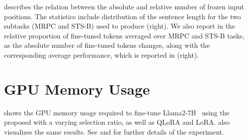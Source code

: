 

 describes the relation between the absolute and relative number of frozen input positions. The statistics include distribution of the sentence length for the two subtasks (MRPC and STS-B) used to produce  (right). We also report in  the relative proportion of fine-tuned tokens averaged over MRPC and STS-B tasks, as the absolute number of fine-tuned tokens changes, along with the corresponding average performance, which is reported in   (right).

\vspace{0.45em}
\section{GPU Memory Usage}\label{app:gpu_mem_usage}
\vspace{0.05em}

 shows the GPU memory usage required to fine-tune Llama2-7B~\citep{touvron_23} using the proposed \method with a varying selection ratio, as well as QLoRA and LoRA.
 also visualizes the same results. See  and  for further details of the experiment.
